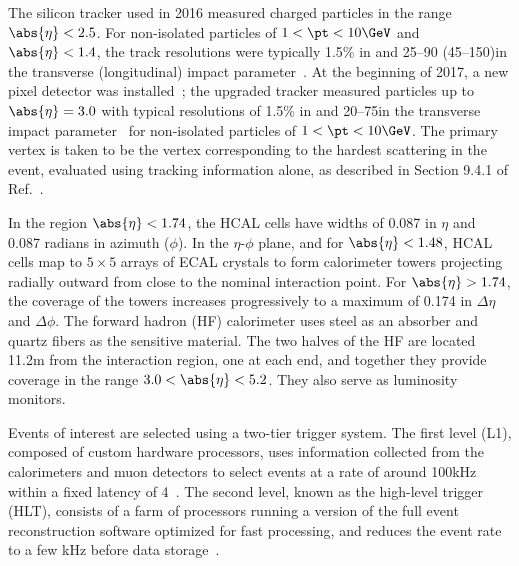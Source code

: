 The silicon tracker used in 2016 measured charged particles in the range $\abs{\eta} < 2.5$. For non-isolated particles of $1 < \pt < 10\GeV$ and $\abs{\eta} < 1.4$, the track resolutions were typically 1.5\% in \pt and 25--90 (45--150)\mum in the transverse (longitudinal) impact parameter~\cite{TRK-11-001}. At the beginning of 2017, a new pixel detector was installed~\cite{Phase1Pixel}; the upgraded tracker measured particles up to $\abs{\eta} = 3.0$ with typical resolutions of 1.5\% in \pt and 20--75\mum in the transverse impact parameter~\cite{DP-2020-049} for non-isolated particles of $1 < \pt < 10\GeV$. The primary vertex is taken to be the vertex corresponding to the hardest scattering in the event, evaluated using tracking information alone, as described in Section 9.4.1 of Ref.~\cite{CMS-TDR-15-02}. 

In the region $\abs{\eta} < 1.74$, the HCAL cells have widths of 0.087 in $\eta$ and 0.087 radians in azimuth ($\phi$). In the $\eta$-$\phi$ plane, and for $\abs{\eta} < 1.48$, HCAL cells map to $5{\times}5$ arrays of ECAL crystals to form calorimeter towers projecting radially outward from close to the nominal interaction point. For $\abs{\eta} > 1.74$, the coverage of the towers increases progressively to a maximum of 0.174 in $\Delta \eta$ and $\Delta \phi$. The forward hadron (HF) calorimeter uses steel as an absorber and quartz fibers as the sensitive material. The two halves of the HF are located 11.2\unit{m} from the interaction region, one at each end, and together they provide coverage in the range $3.0 < \abs{\eta} < 5.2$. They also serve as luminosity monitors.  

Events of interest are selected using a two-tier trigger system. The first level (L1), composed of custom hardware processors, uses information collected from the calorimeters and muon detectors to select events at a rate of around 100\unit{kHz} within a fixed latency of 4\mus~\cite{Sirunyan:2020zal}. The second level, known as the high-level trigger (HLT), consists of a farm of processors running a version of the full event reconstruction software optimized for fast processing, and reduces the event rate to a few kHz before data storage~\cite{Khachatryan:2016bia,CMS:2024aqx}.

